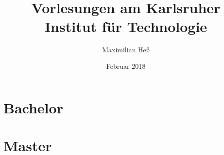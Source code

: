 \documentclass[a4paper,8pt,titlepage]{scrbook}
\title{Vorlesungen am Karlsruher Institut für Technologie}
\author{Maximilian Heß}
\date{Februar 2018}
\begin{document}
\maketitle
\tableofcontents

\part{Bachelor}










\part{Master}
















\end{document}
